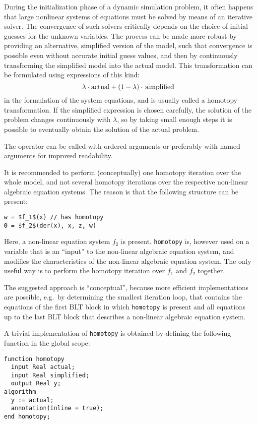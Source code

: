 \begin{nonnormative}
During the initialization phase of a dynamic simulation problem, it often happens that large nonlinear systems of equations must be solved by means of an iterative solver.
The convergence of such solvers critically depends on the choice of initial guesses for the unknown variables.
The process can be made more robust by providing an alternative, simplified version of the model, such that convergence is possible even without accurate initial guess values, and then by continuously transforming the simplified model into the actual model.
This transformation can be formulated using expressions of this kind:
\begin{equation*}
\lambda\cdot\text{\lstinline!actual!} + (1-\lambda)\cdot\text{\lstinline!simplified!}
\end{equation*}
in the formulation of the system equations, and is usually called a homotopy transformation.
If the simplified expression is chosen carefully, the solution of the problem changes continuously with $\lambda$, so by taking small enough steps it is possible to eventually obtain the solution of the actual problem.

The operator can be called with ordered arguments or preferably with named arguments for improved readability.

It is recommended to perform (conceptually) one homotopy iteration over the whole model, and not several homotopy iterations over the respective non-linear algebraic equation systems.
The reason is that the following structure can be present:
\begin{lstlisting}[language=modelica]
w = $f_1$(x) // has homotopy
0 = $f_2$(der(x), x, z, w)
\end{lstlisting}

Here, a non-linear equation system $f_2$ is present.
\lstinline!homotopy! is, however used on a variable that is an ``input'' to the non-linear algebraic equation system, and modifies the characteristics of the non-linear algebraic equation system.
The only useful way is to perform the homotopy iteration over $f_1$ and $f_2$ together.

The suggested approach is ``conceptual'', because more efficient implementations are possible, e.g.\ by determining the smallest iteration loop, that contains the equations of the first BLT block in which \lstinline!homotopy! is present and all equations up to the last BLT block that describes a non-linear algebraic equation system.

A trivial implementation of \lstinline!homotopy! is obtained by defining the following function in the global scope:
\begin{lstlisting}[language=modelica]
function homotopy
  input Real actual;
  input Real simplified;
  output Real y;
algorithm
  y := actual;
  annotation(Inline = true);
end homotopy;
\end{lstlisting}
\end{nonnormative}

